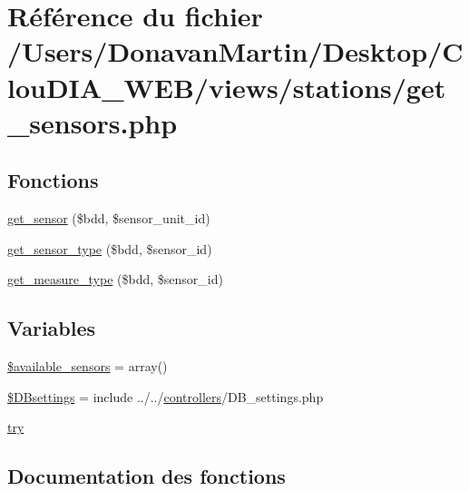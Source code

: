\hypertarget{get__sensors_8php}{}\section{Référence du fichier /\+Users/\+Donavan\+Martin/\+Desktop/\+Clou\+D\+I\+A\+\_\+\+W\+E\+B/views/stations/get\+\_\+sensors.php}
\label{get__sensors_8php}
\subsection*{Fonctions}
\begin{DoxyCompactItemize}
\item 
\hyperlink{get__sensors_8php_a3c370a5ea24dd9df0ec3136c4d018e4a}{get\+\_\+sensor} (\$bdd, \$sensor\+\_\+unit\+\_\+id)
\item 
\hyperlink{get__sensors_8php_a3b3bb9bb9dfffa08561e51c325794b6a}{get\+\_\+sensor\+\_\+type} (\$bdd, \$sensor\+\_\+id)
\item 
\hyperlink{get__sensors_8php_aeae23e3c2439640ac6ac5defa3ede67b}{get\+\_\+measure\+\_\+type} (\$bdd, \$sensor\+\_\+id)
\end{DoxyCompactItemize}
\subsection*{Variables}
\begin{DoxyCompactItemize}
\item 
\hyperlink{get__sensors_8php_aac620463ecd735ff841a13ade85cea1e}{\$available\+\_\+sensors} = array()
\item 
\hyperlink{get__sensors_8php_a9d97b484ee351b8e6034d74504996e9f}{\$\+D\+Bsettings} = include \textquotesingle{}../../\hyperlink{index_8js_ae15548a4836771e65070b7b408b2d46a}{controllers}/D\+B\+\_\+settings.\+php\textquotesingle{}
\item 
\hyperlink{get__sensors_8php_abe4cc9788f52e49485473dc699537388}{try}
\end{DoxyCompactItemize}


\subsection{Documentation des fonctions}
\hypertarget{get__sensors_8php_aeae23e3c2439640ac6ac5defa3ede67b}{}
